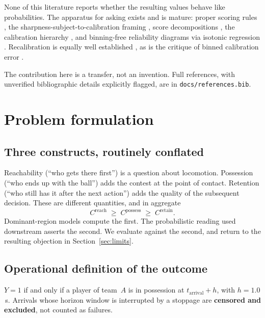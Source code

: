 \documentclass[11pt,a4paper]{article}
\begin{document}
None of this literature reports whether the resulting values behave like
probabilities. The apparatus for asking exists and is mature: proper scoring
rules \citep{brier1950verification, gneiting2007proper}, the
sharpness-subject-to-calibration framing \citep{gneiting2007sharpness}, score
decompositions \citep{murphy1973partition}, the calibration hierarchy
\citep{vancalster2016hierarchy, vancalster2019achilles}, and binning-free
reliability diagrams via isotonic regression \citep{dimitriadis2021corp}.
Recalibration is equally well established \citep{platt1999probabilistic,
zadrozny2002isotonic, kull2017beta}, as is the critique of binned calibration
error \citep{nixon2019measuring, kumar2019verified, vaicenavicius2019evaluating,
roelofs2022mitigating}.

The contribution here is a transfer, not an invention. Full references, with
unverified bibliographic details explicitly flagged, are in
\texttt{docs/references.bib}.

\section{Problem formulation}

\subsection{Three constructs, routinely conflated}

Reachability (``who gets there first'') is a question about locomotion.
Possession (``who ends up with the ball'') adds the contest at the point of
contact. Retention (``who still has it after the next action'') adds the quality
of the subsequent decision. These are different quantities, and in aggregate
\[
  C^{\mathrm{reach}} \;\geq\; C^{\mathrm{possess}} \;\geq\; C^{\mathrm{retain}}.
\]
Dominant-region models compute the first. The probabilistic reading used
downstream asserts the second. We evaluate against the second, and return to the
resulting objection in Section~\ref{sec:limits}.

\subsection{Operational definition of the outcome}

\begin{plainbox}
\small
$Y = 1$ if and only if a player of team~$A$ is in possession at
$t_{\mathrm{arrival}} + h$, with $h = 1.0$\,s. Arrivals whose horizon window is
interrupted by a stoppage are \textbf{censored and excluded}, not counted as
failures.
\end{plainbox}
\end{document}

